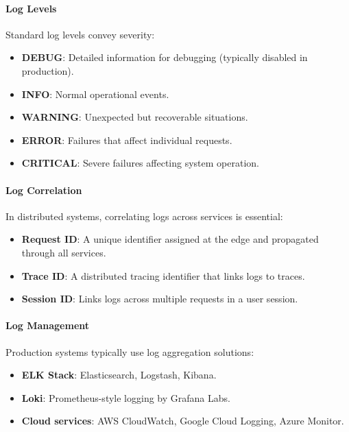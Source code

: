 \documentclass[a4paper,twoside]{sapthesis}
\begin{document}
\paragraph{Log Levels}

Standard log levels convey severity:
\begin{itemize}
    \item \textbf{DEBUG}: Detailed information for debugging (typically disabled in production).
    \item \textbf{INFO}: Normal operational events.
    \item \textbf{WARNING}: Unexpected but recoverable situations.
    \item \textbf{ERROR}: Failures that affect individual requests.
    \item \textbf{CRITICAL}: Severe failures affecting system operation.
\end{itemize}

\paragraph{Log Correlation}

In distributed systems, correlating logs across services is essential:
\begin{itemize}
    \item \textbf{Request ID}: A unique identifier assigned at the edge and propagated through all services.
    \item \textbf{Trace ID}: A distributed tracing identifier that links logs to traces.
    \item \textbf{Session ID}: Links logs across multiple requests in a user session.
\end{itemize}

\paragraph{Log Management}

Production systems typically use log aggregation solutions:
\begin{itemize}
    \item \textbf{ELK Stack}: Elasticsearch, Logstash, Kibana.
    \item \textbf{Loki}: Prometheus-style logging by Grafana Labs.
    \item \textbf{Cloud services}: AWS CloudWatch, Google Cloud Logging, Azure Monitor.
\end{itemize}
\end{document}

